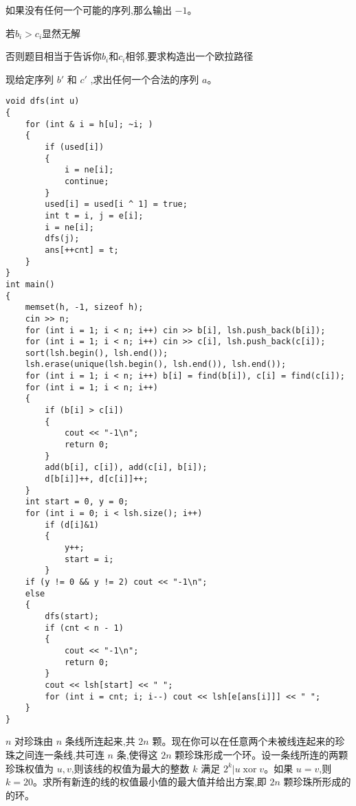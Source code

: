 \documentclass[a4paper,fontset=none]{ctexart}
\begin{document}
如果没有任何一个可能的序列,那么输出 $-1$。

若$b_i>c_i$显然无解

否则题目相当于告诉你$b_i$和$c_i$相邻,要求构造出一个欧拉路径

现给定序列 $b'$ 和 $ c'$ ,求出任何一个合法的序列 $a$。

\begin{verbatim}
void dfs(int u)
{
    for (int & i = h[u]; ~i; )
    {
        if (used[i])
        {
            i = ne[i];
            continue;
        }
        used[i] = used[i ^ 1] = true;
        int t = i, j = e[i];
        i = ne[i];
        dfs(j);
        ans[++cnt] = t;
    }
}
int main()
{
    memset(h, -1, sizeof h);
    cin >> n;
    for (int i = 1; i < n; i++) cin >> b[i], lsh.push_back(b[i]);
    for (int i = 1; i < n; i++) cin >> c[i], lsh.push_back(c[i]);
    sort(lsh.begin(), lsh.end());
    lsh.erase(unique(lsh.begin(), lsh.end()), lsh.end());
    for (int i = 1; i < n; i++) b[i] = find(b[i]), c[i] = find(c[i]);
    for (int i = 1; i < n; i++)
    {
        if (b[i] > c[i])
        {
            cout << "-1\n";
            return 0;
        }
        add(b[i], c[i]), add(c[i], b[i]);
        d[b[i]]++, d[c[i]]++;
    }
    int start = 0, y = 0;
    for (int i = 0; i < lsh.size(); i++)
        if (d[i]&1)
        {
            y++;
            start = i;
        }
    if (y != 0 && y != 2) cout << "-1\n";
    else
    {
        dfs(start);
        if (cnt < n - 1)
        {
            cout << "-1\n";
            return 0;
        }
        cout << lsh[start] << " ";
        for (int i = cnt; i; i--) cout << lsh[e[ans[i]]] << " ";
    }
}
\end{verbatim}

$n$ 对珍珠由 $n$ 条线所连起来,共 $2n$ 颗。现在你可以在任意两个未被线连起来的珍珠之间连一条线,共可连 $n$ 条,使得这 $2n$ 颗珍珠形成一个环。设一条线所连的两颗珍珠权值为 $u,v$,则该线的权值为最大的整数 $k$ 满足 $2^k | u \operatorname{xor} v$。如果 $u=v$,则 $k=20$。求所有新连的线的权值最小值的最大值并给出方案,即 $2n$ 颗珍珠所形成的的环。
\end{document}
